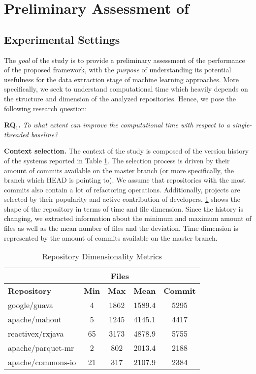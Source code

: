 
\section{Preliminary Assessment of \iris}
\label{sec:assessment}

\subsection{Experimental Settings}
\label{sec:method}
The \emph{goal} of the study is to provide a preliminary assessment of the performance of the proposed framework, with the \emph{purpose} of understanding its potential usefulness for the data extraction stage of machine learning approaches. More specifically, we seek to understand computational time which heavily depends on the structure and dimension of the analyzed repositories. Hence, we pose the following research question:

\begin{center}
	\begin{examplebox}
		\textbf{RQ$_1$.} \emph{To what extent can \iris improve the computational time with respect to a single-threaded baseline?}	
	\end{examplebox}
\end{center}

\textbf{Context selection.} The context of the study is composed of the version history of the systems reported in Table \ref{tab:systems}. The selection process is driven by their amount of commits available on the master branch (or more specifically, the branch which HEAD is pointing to). We assume that repositories with the most commits also contain a lot of refactoring operations. Additionally, projects are selected by their popularity and active contribution of developers. \ref{tab:systems} shows the shape of the repository in terms of time and file dimension. Since the history is changing, we extracted information about the minimum and maximum amount of files as well as the mean number of files and the deviation. Time dimension is represented by the amount of commits available on the master branch.

\begin{table}[htbp]
\caption{Repository Dimensionality Metrics}
\label{tab:systems}
\begin{center}
\begin{tabular}{|l|c|c|c|c|}
\hline
&\multicolumn{3}{c|}{Files}&\\
\hline
\textbf{Repository}&\textbf{Min}&\textbf{Max}&\textbf{Mean}&\textbf{Commit}\\
\hline
google/guava& 4 & 1862 & 1589.4 & 5295\\
\hline
apache/mahout& 5 & 1245 & 4145.1 & 4417\\
\hline
reactivex/rxjava& 65 & 3173 & 4878.9 & 5755\\
\hline
apache/parquet-mr & 2 & 802 & 2013.4 & 2188\\
\hline
apache/commons-io & 21 & 317 & 2107.9 & 2384\\
\hline
\end{tabular}
\end{center}
\end{table}

